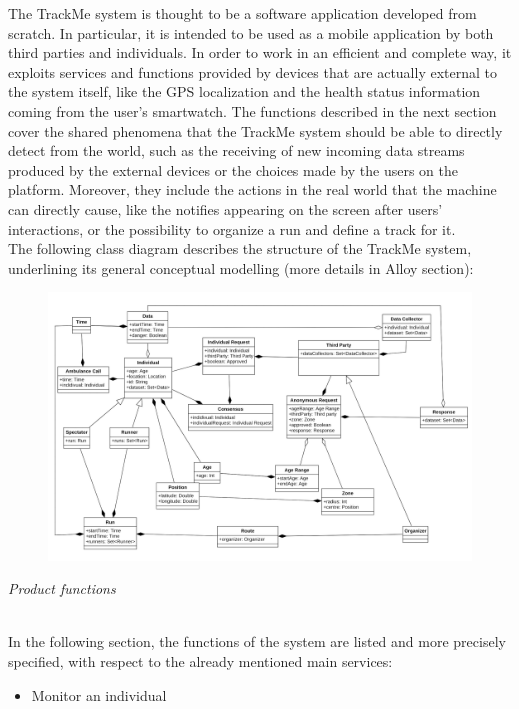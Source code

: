 \documentclass{article}
\begin{document}
\begin{legal}
\begin{legal}
{The TrackMe system is thought to be a software application developed from scratch. In particular, it is intended to be used as a mobile application by both third parties and individuals.
In order to work in an efficient and complete way, it exploits services and functions provided by devices that are actually external to the system itself, like the GPS 				localization and the health status information coming from the user’s smartwatch.
The functions described in the next section cover the shared phenomena that the TrackMe system should be able to directly detect from the world, such as the receiving of new incoming data streams produced by the external devices or the choices made by the users on the platform. Moreover, they include the actions in the real world that the machine can directly cause, like the notifies appearing on the screen after users' interactions, or the possibility to organize a run and define a track for it. \\
The following class diagram describes the structure of the TrackMe system, underlining its general conceptual modelling (more details in Alloy section): \\
			}
			\begin{figure}[H]
  			\includegraphics[width=\linewidth]{./images/UML1-0.png}
			\end{figure}
		\item \textit{Product functions} \\\\
		{\normalfont
In the following section, the functions of the system are listed and more precisely specified, with
respect to the already mentioned main services:
		\begin{itemize}
		\item Monitor an individual\\\\

\end{itemize}}
\end{legal}
\end{legal}
\end{document}
